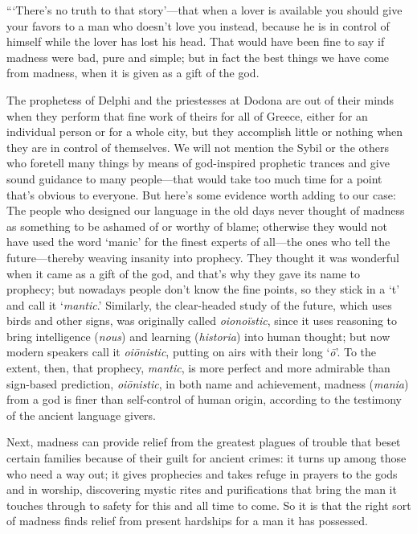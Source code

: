 “‘There’s no truth to that story’---that when a lover is available you
should give your favors to a man who doesn’t love you instead, because
he is in control of himself while the lover has lost his head. That
would have been fine to say if madness were bad, pure and simple; but in
fact the best things we have come from madness, when it is given as a
gift of the god.

The prophetess of Delphi and the priestesses at Dodona are out
of their minds when they perform that fine work of theirs for all of
Greece, either for an individual person or for a whole city, but they
accomplish little or nothing when they are in control of themselves. We
will not mention the Sybil or the others who foretell many things by
means of god-inspired prophetic trances and give sound guidance to many
people---that would take too much time for a point that’s obvious to
everyone. But here’s some evidence worth adding to our case: The people
who designed our language in the old days never thought of madness as
something to be ashamed of or worthy of blame; otherwise they would not
have used the word ‘manic’ for the finest experts of all---the ones who
tell the future---thereby weaving insanity into prophecy. They
thought it was wonderful when it came as a gift of the god, and that’s
why they gave its name to prophecy; but nowadays people don’t know the
fine points, so they stick in a ‘t’ and call it ‘{\em mantic}.’
Similarly, the clear-headed study of the future, which uses birds and
other signs, was originally called {\em oionoïstic}, since it uses
reasoning to bring intelligence ({\em nous}) and learning
({\em historia}) into human thought; but now modern speakers call it
{\em oiōnistic}, putting on airs with their long ‘{\em ō}’. To
the extent, then, that prophecy, {\em mantic}, is more perfect and more
admirable than sign-based prediction, {\em oiōnistic}, in both name and
achievement, madness ({\em mania}) from a god is finer than self-control
of human origin, according to the testimony of the ancient language
givers.

Next, madness can provide relief from the greatest plagues of trouble
that beset certain families because of their guilt for ancient crimes:
it turns up among those who need a way out; it gives prophecies and
takes refuge in prayers to the gods and in worship, discovering
mystic rites and purifications that bring the man it
touches through to
safety for this and all time to come. So it is that the right sort of
madness finds relief from present hardships for a man it has possessed.

